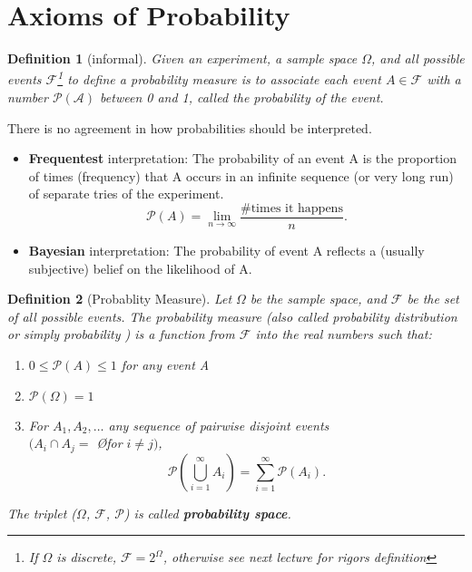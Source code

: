 \documentclass[a4paper]{article}
\numberwithin{counter}{subsection}
\theoremstyle{break}
\newtheorem{definition}{Definition}
\begin{document}
\section{Axioms of Probability}%
\label{sec:axioms_of_probability}

\begin{definition}[informal]
	Given an experiment, a sample space $\Omega$, and all possible events $\mathcal{F}$\footnote{If $\Omega$ is discrete, $\mathcal{F}= 2^{\Omega}$, otherwise see next lecture for rigors definition} to define a probability measure is to associate each event $A \in \mathcal{F}$ with a number $\mathcal{P(A)}$ between 0 and 1, called the probability of the event.\\ 
\end{definition}

There is no agreement in how probabilities should be interpreted.
\begin{itemize}
	\item \textbf{Frequentest} interpretation: The probability of an event A is the proportion of times (frequency) that A occurs in an infinite sequence  (or very long run) of separate tries of the experiment. \[
		\mathcal{P}(A) = \lim_{n \to \infty} \frac{\text{\# times it happens}}{n}
	.\]  

\item \textbf{Bayesian} interpretation: The probability of event A reflects a (usually subjective) belief on the likelihood of A.
\end{itemize}

\begin{definition}[Probablity Measure]
	Let $\Omega$ be the sample space, and $\mathcal{F}$ be the set of all possible events. The probability measure (also called probability distribution or simply probability ) is a function from $\mathcal{F}$ into the real numbers such that:

	\begin{enumerate}
		\item $0 \le \mathcal{P}(A) \le 1$ for any event A
		\item $\mathcal{P}(\Omega) = 1$ 
		\item For $A_1, A_2, \ldots$ any sequence of pairwise disjoint events\\ $(A_i \cap A_j = $ \O for $i \neq j)$, \[
				\mathcal{P}(\bigcup_{i = 1}^{\infty} A_i) = \sum_{i=1}^{\infty} \mathcal{P}(A_i)
		.\] 
	\end{enumerate}

The triplet ($\Omega$, $\mathcal{F}$, $\mathcal{P}$) is called \textbf{probability space}.
\end{definition}
\end{document}
